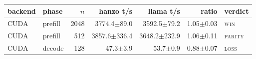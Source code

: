 \begin{tabular}{@{}llrrrrl@{}}
\toprule
backend & phase & $n$ & hanzo t/s & llama t/s & ratio & verdict \\
\midrule
CUDA & prefill & 2048 & 3774.4$\pm$89.0 & 3592.5$\pm$79.2 & 1.05$\pm$0.03 & \textsc{win} \\
CUDA & prefill & 512 & 3857.6$\pm$336.4 & 3648.2$\pm$232.9 & 1.06$\pm$0.11 & \textsc{parity} \\
CUDA & decode & 128 & 47.3$\pm$3.9 & 53.7$\pm$0.9 & 0.88$\pm$0.07 & \textsc{loss} \\
\bottomrule
\end{tabular}
